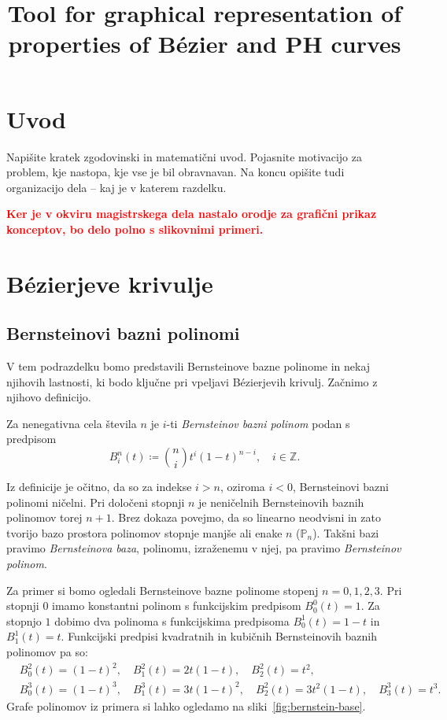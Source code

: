 \documentclass[isrm2, tisk]{fmfdelo}
\title{Tool for graphical representation of properties of Bézier and PH curves}
\newcommand{\Z}{\mathbb Z}
\newcommand{\bernstein}[2]{\binom{#1}{#2}t^{#2}(1-t)^{#1-#2}}
\newcommand{\mycomment}[1]{\textbf{\textcolor{red}{#1}}}
\begin{document}
    \section{Uvod}
    Napišite kratek zgodovinski in matematični uvod. Pojasnite motivacijo za problem, kje
    nastopa, kje vse je bil obravnavan. Na koncu opišite tudi organizacijo dela -- kaj je v
    katerem razdelku.


    \mycomment{Ker je v okviru magistrskega dela nastalo orodje za grafični prikaz konceptov, bo delo polno s slikovnimi primeri.}


    \section{Bézierjeve krivulje}\label{sec:bezierjeve-krivulje}

    \subsection{Bernsteinovi bazni polinomi}\label{subsec:bernsteinovi-polinomi}
    V tem podrazdelku bomo predstavili Bernsteinove bazne polinome in nekaj njihovih lastnosti, ki bodo ključne pri vpeljavi Bézierjevih krivulj.
    Začnimo z njihovo definicijo.
    \begin{definicija}
        \label{def:bernstein}
        Za nenegativna cela števila $n$ je $i$-ti \textit{Bernsteinov bazni polinom} podan s predpisom \[B_i^n(t)\coloneqq\bernstein{n}{i},\quad i\in\Z.\]
    \end{definicija}
    \noindent Iz definicije je očitno, da so za indekse $i>n$, oziroma $i<0$, Bernsteinovi bazni polinomi ničelni.
    Pri določeni stopnji $n$ je neničelnih Bernsteinovih baznih polinomov torej $n+1$.
    Brez dokaza povejmo, da so linearno neodvisni in zato tvorijo bazo prostora polinomov stopnje manjše ali enake $n$ ($\mathbb{P}_n$).
    Takšni bazi pravimo \textit{Bernsteinova baza}, polinomu, izraženemu v njej, pa pravimo \textit{Bernsteinov polinom}.
    \begin{primer}
        \label{primer:bernsteinovi}
        Za primer si bomo ogledali Bernsteinove bazne polinome stopenj $n=0,1,2,3$.
        Pri stopnji $0$ imamo konstantni polinom s funkcijskim predpisom $B_{0}^{0}(t) = 1$.
        Za stopnjo $1$ dobimo dva polinoma s funkcijskima predpisoma $B_{0}^{1}(t) = 1-t$ in $B_{1}^{1}(t) = t$.
        Funkcijski predpisi kvadratnih in kubičnih Bernsteinovih baznih polinomov pa so:
        \begin{align*}
            &B_{0}^{2}(t) = (1-t)^2,\quad B_{1}^{2}(t) = 2t(1-t),\quad B_{2}^{2}(t) = t^2,  \\
            &B_{0}^{3}(t) = (1-t)^3,\quad B_{1}^{3}(t) = 3t(1-t)^2,\quad B_{2}^{2}(t) = 3t^2(1-t),\quad B_{3}^{3}(t) = t^3.
        \end{align*}
        Grafe polinomov iz primera si lahko ogledamo na sliki~\ref{fig:bernstein-base}.
    \end{primer}
\end{document}
